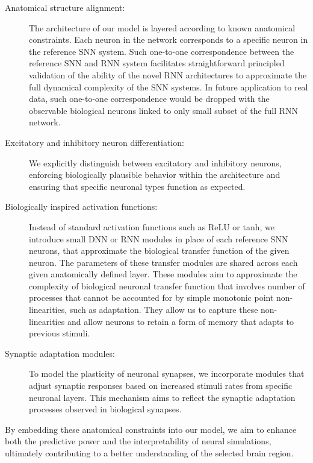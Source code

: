\begin{description}
\item[Anatomical structure alignment:] The architecture of our
model is layered according to known anatomical constraints. Each
neuron in the network corresponds to a specific neuron in the reference SNN system. 
Such one-to-one correspondence between the reference SNN and RNN system facilitates
straightforward principled validation of the ability of the novel RNN architectures to approximate the full dynamical complexity of the SNN systems. In future application to real data, such one-to-one correspondence would be dropped with the 
observable biological neurons linked to only small subset of the full RNN network.

\item[Excitatory and inhibitory neuron differentiation:] We explicitly
distinguish between excitatory and inhibitory neurons, enforcing
biologically plausible behavior within the architecture and ensuring
that specific neuronal types function as expected.

\item[Biologically inspired activation functions:] Instead of standard
activation functions such as ReLU or tanh, we introduce small 
DNN or RNN modules in place of each reference SNN neurons, that approximate the biological transfer function of the given neuron. The parameters of these transfer modules are shared across each given anatomically defined layer. These modules aim to approximate the complexity of biological neuronal transfer function that 
involves number of processes that cannot be accounted for by simple monotonic point non-linearities, such as adaptation. They allow us to capture these non-linearities and allow neurons to retain a form of memory that adapts to previous stimuli.

\item[Synaptic adaptation modules:] To model the plasticity of neuronal
synapses, we incorporate modules that adjust synaptic responses based on
increased stimuli rates from specific neuronal layers. This mechanism aims
to reflect the synaptic adaptation processes observed in biological
synapses.
\end{description}

By embedding these anatomical constraints into our model, we aim to
enhance both the predictive power and the interpretability of neural simulations,
ultimately contributing to a better understanding of the selected brain region.

